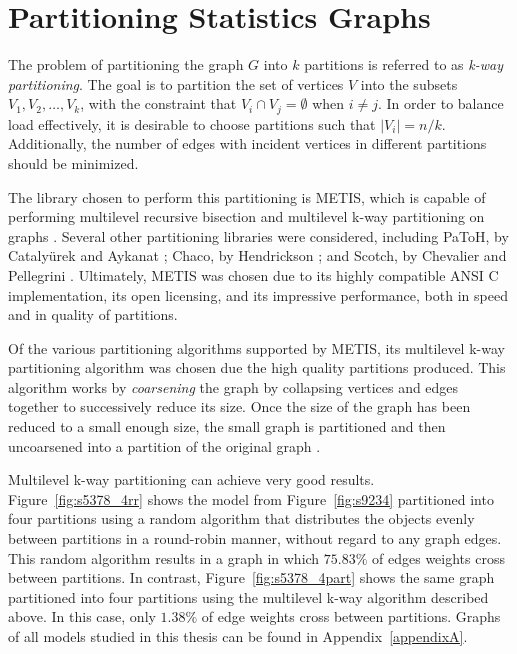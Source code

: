 \documentclass[11pt]{book}
\begin{document}
\section{Partitioning Statistics Graphs}

The problem of partitioning the graph \(G\) into \(k\) partitions is referred to as \emph{k-way partitioning}. The goal is to partition the set of vertices \(V\) into the subsets \(V_1, V_2, \ldots, V_k\), with the constraint that \(V_i \cap V_j = \emptyset\) when \(i \neq j\). In order to balance load effectively, it is desirable to choose partitions such that \(|V_i|=n/k\). Additionally, the number of edges with incident vertices in different partitions should be minimized.

The library chosen to perform this partitioning is METIS, which is capable of performing multilevel recursive bisection and multilevel k-way partitioning on graphs \cite{karypis-98}. Several other partitioning libraries were considered, including PaToH, by Catalyürek and Aykanat \cite{catalyurek-11}; Chaco, by Hendrickson \cite{hendrickson-94}; and Scotch, by Chevalier and Pellegrini \cite{chevalier-08}. Ultimately, METIS was chosen due to its highly compatible ANSI C implementation, its open licensing, and its impressive performance, both in speed and in quality of partitions. 

Of the various partitioning algorithms supported by METIS, its multilevel k-way partitioning algorithm was chosen due the high quality partitions produced. This algorithm works by \emph{coarsening} the graph by collapsing vertices and edges together to successively reduce its size. Once the size of the graph has been reduced to a small enough size, the small graph is partitioned and then uncoarsened into a partition of the original graph \cite{karypis-98}.

Multilevel k-way partitioning can achieve very good results. Figure~\ref{fig:s5378_4rr} shows the model from Figure~\ref{fig:s9234} partitioned into four partitions using a random algorithm that distributes the objects evenly between partitions in a round-robin manner, without regard to any graph edges. This random algorithm results in a graph in which \(75.83\%\) of edges weights cross between partitions. In contrast, Figure~\ref{fig:s5378_4part} shows the same graph partitioned into four partitions using the multilevel k-way algorithm described above. In this case, only \(1.38\%\) of edge weights cross between partitions. Graphs of all models studied in this thesis can be found in Appendix~\ref{appendixA}.
\end{document}
